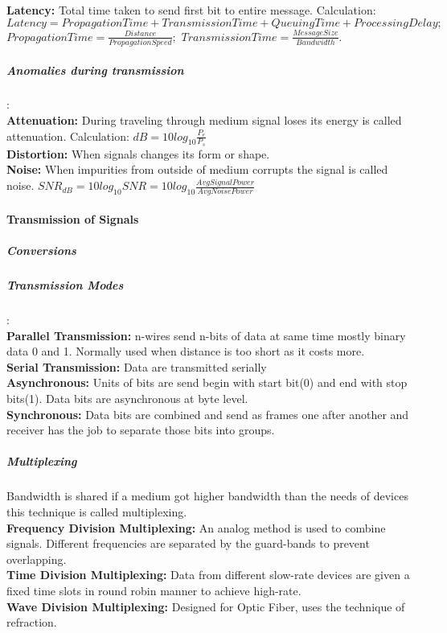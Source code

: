 \indent \textbf{Latency:} Total time taken to send first bit to entire message. Calculation: $Latency = PropagationTime + TransmissionTime + QueuingTime + ProcessingDelay;$
$PropagationTime = \frac{Distance}{PropagationSpeed};$
$TransmissionTime = \frac{MessageSize}{Bandwidth}$. \\
\subparagraph{Anomalies during transmission}:\\
\indent \textbf{Attenuation:} During traveling through medium signal loses its energy is called attenuation. Calculation: $dB=10log_{10}\frac{P_e}{P_s}$\\
\indent \textbf{Distortion:} When signals changes its form or shape.\\
\indent \textbf{Noise:} When impurities from outside of medium corrupts the signal is called noise. $SNR_{dB}=10log_{10}SNR=10log_{10} \frac{AvgSignalPower}{AvgNoisePower}$\\
\paragraph{Transmission of Signals}
\subparagraph{Conversions}
\subparagraph{Transmission Modes}:\\
\indent \textbf{Parallel Transmission:} n-wires send n-bits of data at same time mostly binary data 0 and 1. Normally used when distance is too short as it costs more.\\
\indent \textbf{Serial Transmission:} Data are transmitted serially\\
\indent \indent \textbf{Asynchronous:} Units of bits are send begin with start bit(0) and end with stop bits(1). Data bits are asynchronous at byte level.\\
\indent \indent \textbf{Synchronous:} Data bits are combined and send as frames one after another and receiver has the job to separate those bits into groups.\\
\subparagraph{Multiplexing} Bandwidth is shared if a medium got higher bandwidth than the needs of devices this technique is called multiplexing.\\
\indent \textbf{Frequency Division Multiplexing:} An analog method is used to combine signals. Different frequencies are separated by the guard-bands to prevent overlapping.\\
\indent \textbf{Time Division Multiplexing:} Data from different slow-rate devices are given a fixed time slots in round robin manner to achieve high-rate.\\
\indent \textbf{Wave Division Multiplexing:} Designed for Optic Fiber, uses the technique of refraction.\\
